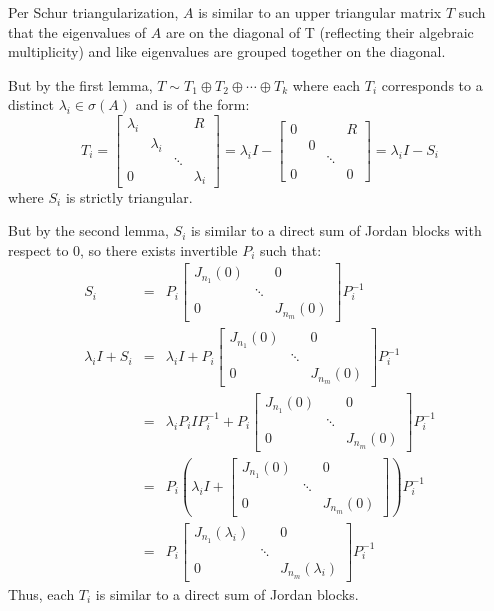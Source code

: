 \documentclass[letterpaper,12pt,fleqn]{article}
\renewcommand{\l}{\lambda}
\renewcommand{\o}{\sigma}
\begin{document}
\begin{theproof}
  Per Schur triangularization, $A$ is similar to an upper triangular matrix $T$ such that
  the eigenvalues of $A$ are on the diagonal of T (reflecting their algebraic
  multiplicity) and like eigenvalues are grouped together on the diagonal.

  But by the first lemma, $T\sim T_1\oplus T_2\oplus\cdots\oplus T_k$ where each $T_i$
  corresponds to a distinct $\l_i\in\o(A)$ and is of the form:
  \[T_i=\begin{bmatrix}
  \l_i & & & R \\
  & \l_i & & \\
  & & \ddots & \\
  0 & & & \l_i
  \end{bmatrix}=\l_iI-\begin{bmatrix}
    0 & & & R \\
    & 0 & & \\
    & & \ddots & \\
    0 & & & 0
  \end{bmatrix}=\l_iI-S_i\]
  where $S_i$ is strictly triangular.

  But by the second lemma, $S_i$ is similar to a direct sum of Jordan blocks with
  respect to $0$, so there exists invertible $P_i$ such that:
  \begin{eqnarray*}
    S_i &=& P_i\begin{bmatrix}
    J_{n_1}(0) & & 0 \\
    & \ddots & \\
    0 & & J_{n_m}(0)
    \end{bmatrix}P_i^{-1} \\
    \l_iI+S_i &=& \l_iI+ P_i\begin{bmatrix}
    J_{n_1}(0) & & 0 \\
    & \ddots & \\
    0 & & J_{n_m}(0)
    \end{bmatrix}P_i^{-1} \\
    &=& \l_iP_iIP_i^{-1}+ P_i\begin{bmatrix}
    J_{n_1}(0) & & 0 \\
    & \ddots & \\
    0 & & J_{n_m}(0)
    \end{bmatrix}P_i^{-1} \\
    &=& P_i\left(\l_iI+\begin{bmatrix}
    J_{n_1}(0) & & 0 \\
    & \ddots & \\
    0 & & J_{n_m}(0)
    \end{bmatrix}\right)P_i^{-1} \\
    &=& P_i\begin{bmatrix}
    J_{n_1}(\l_i) & & 0 \\
    & \ddots & \\
    0 & & J_{n_m}(\l_i)
    \end{bmatrix}P_i^{-1}
  \end{eqnarray*}
  Thus, each $T_i$ is similar to a direct sum of Jordan blocks.


\end{theproof}
\end{document}
